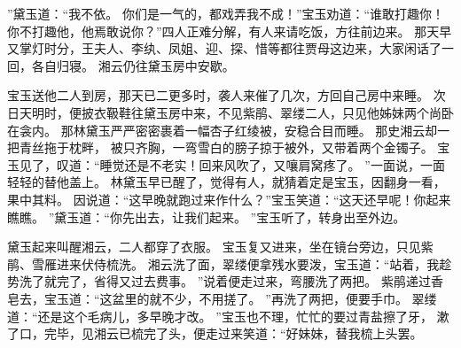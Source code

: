 ”黛玉道：“我不依。
你们是一气的，都戏弄我不成！”宝玉劝道：“谁敢打趣你！你不打趣他，他焉敢说你？”四人正难分解，有人来请吃饭，方往前边来。
那天早又掌灯时分，王夫人、李纨、凤姐、迎、探、惜等都往贾母这边来，大家闲话了一回，各自归寝。
湘云仍往黛玉房中安歇。
\par
宝玉送他二人到房，那天已二更多时，袭人来催了几次，方回自己房中来睡。
次日天明时，便披衣靸鞋往黛玉房中来，不见紫鹃、翠缕二人，只见他姊妹两个尚卧在衾内。
那林黛玉严严密密裹着一幅杏子红绫被，安稳合目而睡。
那史湘云却一把青丝拖于枕畔，
被只齐胸，一弯雪白的膀子掠于被外，又带着两个金镯子。
宝玉见了，叹道：“睡觉还是不老实！回来风吹了，又嚷肩窝疼了。
”一面说，一面轻轻的替他盖上。
林黛玉早已醒了，觉得有人，就猜着定是宝玉，因翻身一看，果中其料。
因说道：“这早晚就跑过来作什么？”宝玉笑道：“这天还早呢！你起来瞧瞧。
”黛玉道：“你先出去，让我们起来。
”宝玉听了，转身出至外边。
\par
黛玉起来叫醒湘云，二人都穿了衣服。
宝玉复又进来，坐在镜台旁边，只见紫鹃、雪雁进来伏侍梳洗。
湘云洗了面，翠缕便拿残水要泼，宝玉道：“站着，我趁势洗了就完了，省得又过去费事。
”说着便走过来，弯腰洗了两把。
紫鹃递过香皂去，宝玉道：“这盆里的就不少，不用搓了。
”再洗了两把，便要手巾。
翠缕道：“还是这个毛病儿，多早晚才改。
”宝玉也不理，忙忙的要过青盐擦了牙，
漱了口，完毕，见湘云已梳完了头，便走过来笑道：“好妹妹，替我梳上头罢。
